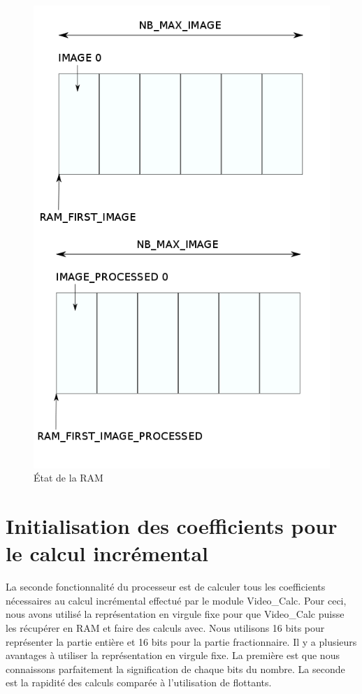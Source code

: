 \documentclass[a4paper,12pt]{report}
\begin{document}
{{{		  \begin{figure}[!h]
		  \centering
		  \includegraphics[scale = 0.3]{ram_management.png}
		\caption{État de la RAM}
		\end{figure}

	 }

	 \section{Initialisation des coefficients pour le calcul incrémental}
	 {La seconde fonctionnalité du processeur est de calculer tous les coefficients nécessaires au calcul incrémental effectué par le module Video\_Calc. Pour ceci, nous avons utilisé la représentation en virgule fixe pour que Video\_Calc puisse les récupérer en RAM et faire des calculs avec. Nous utilisons 16 bits pour représenter la partie entière et 16 bits pour la partie fractionnaire. Il y a plusieurs avantages à utiliser la représentation en virgule fixe. La première est que nous connaissons parfaitement la signification de chaque bits du nombre. La seconde est la rapidité des calculs comparée à l'utilisation de flottants.


}}}
\end{document}
